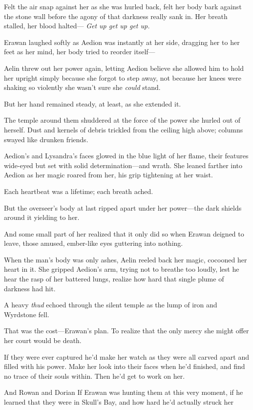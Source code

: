 Felt the air snap against her as she was hurled back, felt her body bark against the stone wall before the agony of that darkness really sank in. Her breath stalled, her blood halted--- \emph{Get up get up get up.}

Erawan laughed softly as Aedion was instantly at her side, dragging her to her feet as her mind, her body tried to reorder itself---

Aelin threw out her power again, letting Aedion believe she allowed him to hold her upright simply because she forgot to step away, not because her knees were shaking so violently she wasn't sure she \emph{could}
stand.

But her hand remained steady, at least, as she extended it.

The temple around them shuddered at the force of the power she hurled out of herself. Dust and kernels of debris trickled from the ceiling high above; columns swayed like drunken friends.

Aedion's and Lysandra's faces glowed in the blue light of her flame, their features wide-eyed but set with solid determination---and wrath. She leaned farther into Aedion as her magic roared from her, his grip tightening at her waist.

Each heartbeat was a lifetime; each breath ached.

But the overseer's body at last ripped apart under her power---the dark shields around it yielding to her.

And some small part of her realized that it only did so when Erawan deigned to leave, those amused, ember-like eyes guttering into nothing.

When the man's body was only ashes, Aelin reeled back her magic, cocooned her heart in it. She gripped Aedion's arm, trying not to breathe too loudly, lest he hear the rasp of her battered lungs, realize how hard that single plume of darkness had hit.

A heavy \emph{thud} echoed through the silent temple as the lump of iron and Wyrdstone fell.

That was the cost---Erawan's plan. To realize that the only mercy she might offer her court would be death.

If they were ever captured  he'd make her watch as they were all carved apart and filled with his power. Make her look into their faces when he'd finished, and find no trace of their souls within. Then he'd get to work on her.

And Rowan and Dorian  If Erawan was hunting them at this very moment, if he learned that they were in Skull's Bay, and how hard he'd actually struck her

